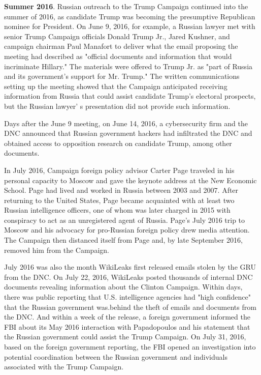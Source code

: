 \documentclass{article}
\begin{document}
\textbf{Summer 2016}. Russian outreach to the Trump Campaign continued into the summer of 2016, as candidate Trump was becoming the presumptive Republican nominee for President. On June 9, 2016, for example, a  Russian lawyer met with senior Trump Campaign officials Donald Trump Jr., Jared Kushner, and campaign chairman Paul Manafort to deliver what the email proposing the meeting had described as "official documents and information that would incriminate Hillary." The materials were offered to Trump Jr. as "part of Russia and its government's support for Mr. Trump." The written communications setting up the meeting showed that the Campaign anticipated receiving information from Russia that could assist candidate Trump's electoral prospects, but the Russian lawyer' s presentation did not provide such information.

Days after the June 9  meeting, on June 14,  2016, a  cybersecurity firm and the DNC announced that Russian government hackers had infiltrated the DNC and obtained access to opposition research on candidate Trump, among other documents.

In July 2016, Campaign foreign policy advisor Carter Page traveled in his personal capacity to Moscow and gave the keynote address at the New Economic School. Page had lived and worked in Russia between 2003 and 2007.  After returning to the United States, Page became acquainted with at least two Russian intelligence officers, one of whom was later charged in 2015 with conspiracy to act as an unregistered agent of Russia.  Page's  July 2016 trip to Moscow and his advocacy for pro-Russian foreign policy drew media attention.  The Campaign then distanced itself from Page and, by late September 2016, removed him from the Campaign.

July 2016 was also the month WikiLeaks first released emails stolen by the GRU from the DNC. On July 22, 2016, WikiLeaks posted thousands of internal DNC documents revealing information about the Clinton Campaign. Within days, there was public reporting that U.S. intelligence agencies had "high confidence" that the Russian government was.behind the theft of emails and documents from the DNC. And within a  week of the release, a  foreign government informed the FBI about its May 2016 interaction with Papadopoulos and his statement that the Russian government could assist the Trump Campaign. On July 31, 2016, based on the foreign government reporting, the FBI opened an investigation into potential coordination between the Russian government and individuals associated with the Trump Campaign.
\end{document}
